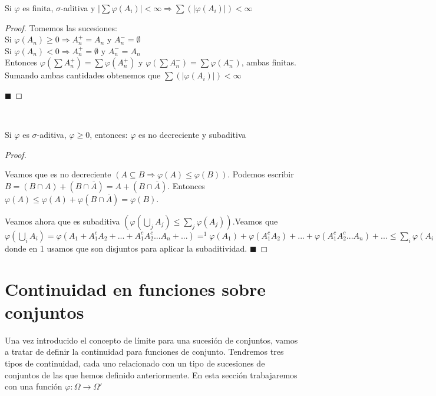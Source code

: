 \documentclass[12pt,a4paper]{book}
\newcommand*{\qed}{\hfill\ensuremath{\blacksquare}}
\begin{document}
\begin{theorem}
Si $\varphi$ es finita, $\sigma$-aditiva y $\displaystyle|\sum\varphi(A_i)|<\infty\Rightarrow\displaystyle\sum(\vert \varphi(A_i)\vert)<\infty$
\end{theorem}
\begin{proof}
Tomemos las sucesiones: \\
Si $\varphi(A_n)\geq 0 \Longrightarrow A_n^{+}=A_n$ y $A_n^{-}=\emptyset$\\
Si $\varphi(A_n)<0 \Longrightarrow A_n^{+}=\emptyset$ y $A_n^{-}=A_n$\\
Entonces $\varphi(\displaystyle\sum A_n^{+})=\displaystyle\sum\varphi(A_n^{+})$ y $\varphi(\displaystyle\sum A_n^{-})=\displaystyle\sum\varphi(A_n^{-})$, ambas finitas. Sumando ambas cantidades obtenemos que $\displaystyle\sum(\vert \varphi(A_i)\vert)<\infty$

\qed
\end{proof}

\begin{theorem}
	\ 
	
Si $\varphi$ es $\sigma$-aditiva, $\varphi \geq 0$, entonces: $\varphi$ es no decreciente y subaditiva
\end{theorem}

\begin{proof}
	\
	 
Veamos que es no decreciente $(A \subseteq B \Rightarrow \varphi (A) \leq \varphi (B))$. Podemos escribir $B = (B \cap A) + (B \cap \overline{A}) = A + (B \cap \overline{A})$. Entonces $\varphi (A) \leq \varphi (A) + \varphi (B \cap \overline{A}) = \varphi (B)$.

Veamos ahora que es subaditiva $(\varphi(\bigcup_{j} A_j) \le \sum_j \varphi(A_j))$.Veamos que 
$\varphi(\bigcup_{i} A_i) = \varphi(A_1 + A_1^c A_2 + ... + A_1^cA_2^c...A_n+ ...) =^1 \varphi(A_1) + \varphi(A_1^c A_2) + ... + \varphi(A_1^cA_2^c...A_n) + ... \leq  \sum_i \varphi(A_i)$ donde en 1 usamos que son disjuntos para aplicar la subaditividad.
\qed
\end{proof}

\section{Continuidad en funciones sobre conjuntos}

Una vez introducido el concepto de límite para una sucesión de conjuntos, vamos a tratar de definir la continuidad para funciones de conjunto. Tendremos tres tipos de continuidad, cada uno relacionado con un tipo de sucesiones de conjuntos de las que hemos definido anteriormente. En esta sección trabajaremos con una función $\varphi : \Omega \to \Omega'$\\
\end{document}
